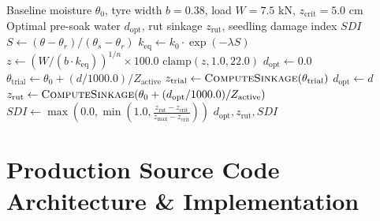 \documentclass[11pt,a4paper]{article}
\theoremstyle{definition}
\theoremstyle{remark}
\begin{document}
\begin{algorithm}[H]
\caption{Coupled Agro-Civil Paddy Nursery Terramechanics Optimization}
\label{alg:coupled_agro_civil}
\begin{algorithmic}[1]
\Require Baseline moisture $\theta_0$, tyre width $b=0.38$, load $W=7.5\text{ kN}$, $z_{\text{crit}}=5.0\text{ cm}$
\Ensure Optimal pre-soak water $d_{\text{opt}}$, rut sinkage $z_{\text{rut}}$, seedling damage index $SDI$
    \State $S \gets (\theta - \theta_r) / (\theta_s - \theta_r)$
    \State $k_{\text{eq}} \gets k_0 \cdot \exp(-\lambda S)$ 
    \State $z \gets (W / (b \cdot k_{\text{eq}}))^{1/n} \times 100.0$ 
    \State \Return $\text{clamp}(z, 1.0, 22.0)$
\EndFunction
\State $d_{\text{opt}} \gets 0.0$
 
    \State $\theta_{\text{trial}} \gets \theta_0 + (d / 1000.0) / Z_{\text{active}}$
    \State $z_{\text{trial}} \gets \Call{ComputeSinkage}{\theta_{\text{trial}}}$
        \State $d_{\text{opt}} \gets d$
    \EndIf
\EndFor
\State $z_{\text{rut}} \gets \Call{ComputeSinkage}{\theta_0 + (d_{\text{opt}}/1000.0)/Z_{\text{active}}}$
\State $SDI \gets \max\left( 0.0, \min\left( 1.0, \frac{z_{\text{rut}} - z_{\text{crit}}}{z_{\text{max}} - z_{\text{crit}}} \right) \right)$
\State \Return $d_{\text{opt}}, z_{\text{rut}}, SDI$
\end{algorithmic}
\end{algorithm}


\section{Production Source Code Architecture \& Implementation}
\end{document}
